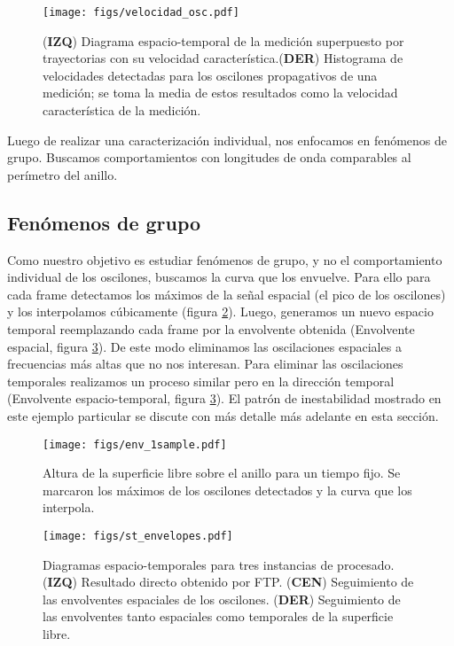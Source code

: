\documentclass[../main.tex]{subfiles}
\begin{document}
\begin{figure}[H]
	\centering
	\texttt{[image: figs/velocidad\_osc.pdf]}
    \caption{(\textbf{IZQ}) Diagrama espacio-temporal de la medición superpuesto por trayectorias con su velocidad característica.(\textbf{DER}) Histograma de velocidades detectadas para los oscilones propagativos de una medición; se toma la media de estos resultados como la velocidad característica de la medición. }
    \label{fig:vel_osc}
\end{figure}

Luego de realizar una caracterización individual, nos enfocamos en fenómenos de grupo. Buscamos comportamientos con longitudes de onda comparables al perímetro del anillo.

\subsection{Fenómenos de grupo}
Como nuestro objetivo es estudiar fenómenos de grupo, y no el comportamiento individual de los oscilones, buscamos la curva que los envuelve. Para ello para cada frame detectamos los máximos de la señal espacial (el pico de los oscilones) y los interpolamos cúbicamente (figura  \ref{fig:envolvente_osc}). Luego, generamos un nuevo espacio temporal reemplazando cada frame por la envolvente obtenida (Envolvente espacial, figura \ref{fig:st_envelopes}). De este modo eliminamos las oscilaciones espaciales a frecuencias más altas que no nos interesan. Para eliminar las oscilaciones temporales realizamos un proceso similar pero en la dirección temporal (Envolvente espacio-temporal, figura \ref{fig:st_envelopes}). El patrón de inestabilidad mostrado en este ejemplo particular se discute con más detalle más adelante en esta sección.

\begin{figure}[H]
	\centering
	\texttt{[image: figs/env\_1sample.pdf]}
    \caption{Altura de la superficie libre sobre el anillo para un tiempo fijo. Se marcaron los máximos de los oscilones detectados y la curva que los interpola.}
    \label{fig:envolvente_osc}
\end{figure}

\begin{figure}[H]
	\centering
	\texttt{[image: figs/st\_envelopes.pdf]}
    \caption{Diagramas espacio-temporales para tres instancias de procesado. (\textbf{IZQ}) Resultado directo obtenido por FTP. (\textbf{CEN}) Seguimiento de las envolventes espaciales de los oscilones. (\textbf{DER}) Seguimiento de las envolventes tanto espaciales como temporales de la superficie libre.}
    \label{fig:st_envelopes}
\end{figure}
\end{document}
